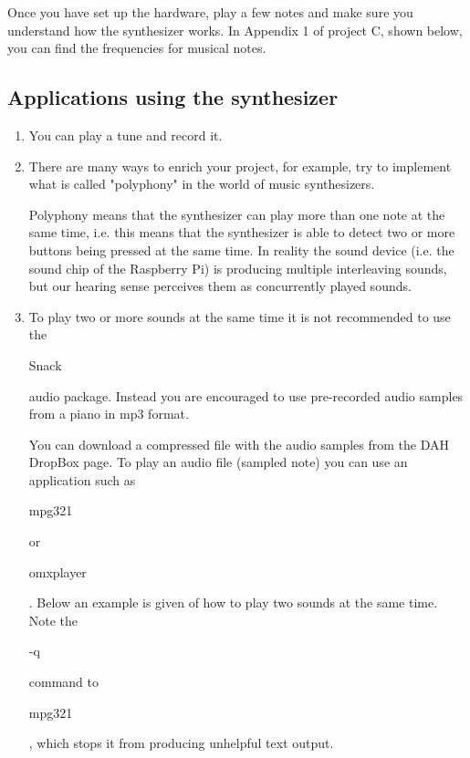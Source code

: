 Once you have set up the hardware, play a few notes and make sure you understand how the synthesizer works. In Appendix 1 of project C, shown below, you can find the frequencies for musical notes.


\subsection{Applications using the synthesizer}

\begin{enumerate}
\item	You can play a tune and record it.


\item There are many ways to enrich your project, for example, try to implement what is called "polyphony" in the world of music synthesizers.

Polyphony means that the synthesizer can play more than one note at the same time, i.e. this means that the synthesizer is able to detect two or more buttons being pressed at the same time. In reality the sound device (i.e. the sound chip of the Raspberry Pi) is producing multiple interleaving sounds, but our hearing sense perceives them as concurrently played sounds.

\item To play two or more sounds at the same time it is not recommended to use the \begin{tt}Snack\end{tt} audio package. Instead you are encouraged to use pre-recorded audio samples from a piano in mp3 format. 

You can download a compressed file with the audio samples from the DAH DropBox page. To play an audio file (sampled note) 
you can use an application such as \begin{tt}mpg321\end{tt} or  \begin{tt}omxplayer\end{tt}. Below an example is given of how to play two sounds at the same time.
Note the \begin{tt}-q\end{tt} command to \begin{tt}mpg321\end{tt}, which stops it from producing unhelpful text output.\\


\vspace*{-0.5cm}
\end{enumerate}

